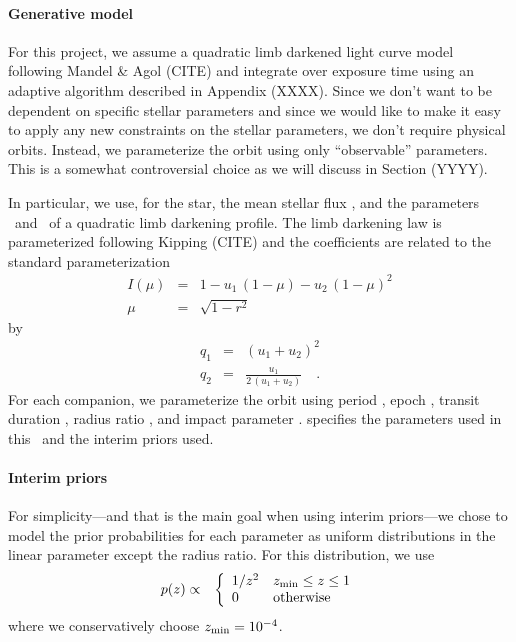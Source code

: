 \documentclass[12pt,preprint]{aastex}
\begin{document}
\paragraph{Generative model}
For this project, we assume a quadratic limb darkened light curve model
following Mandel \& Agol (CITE) and integrate over exposure time using an
adaptive algorithm described in Appendix (XXXX).
Since we don't want to be dependent on specific stellar parameters and since
we would like to make it easy to apply any new constraints on the stellar
parameters, we don't require physical orbits.
Instead, we parameterize the orbit using only ``observable'' parameters.
This is a somewhat controversial choice as we will discuss in Section (YYYY).

In particular, we use, for the star, the mean stellar flux \fstar, and the
parameters \qone\ and \qtwo\ of a quadratic limb darkening profile.
The limb darkening law is parameterized following Kipping (CITE) and the
coefficients are related to the standard parameterization
\begin{eqnarray}
I(\mu) &=& 1 - u_1\,(1-\mu) - u_2\,(1-\mu)^2 \\
\mu &=& \sqrt{1-r^2}
\end{eqnarray}
by
\begin{eqnarray}
q_1 &=& (u_1 + u_2)^2 \\
q_2 &=& \frac{u_1}{2\,(u_1+u_2)} \quad.
\end{eqnarray}
For each companion, we parameterize the orbit using period \period, epoch
\epoch, transit duration \duration, radius ratio \ror, and impact parameter
\impact.
 specifies the parameters used in this \paper\ and the
interim priors used.

\paragraph{Interim priors}
For simplicity---and that is the main goal when using interim priors---we
chose to model the prior probabilities for each parameter as uniform
distributions in the linear parameter except the radius ratio.
For this distribution, we use
\begin{eqnarray}
p(z) &\propto& \left \{ \begin{array}{ll}
1/z^2 & z_\mathrm{min} \le z \le 1 \\
0 & \mathrm{otherwise} \\
\end{array}\right.
\end{eqnarray}
where we conservatively choose $z_\mathrm{min} = 10^{-4}$.
\end{document}
